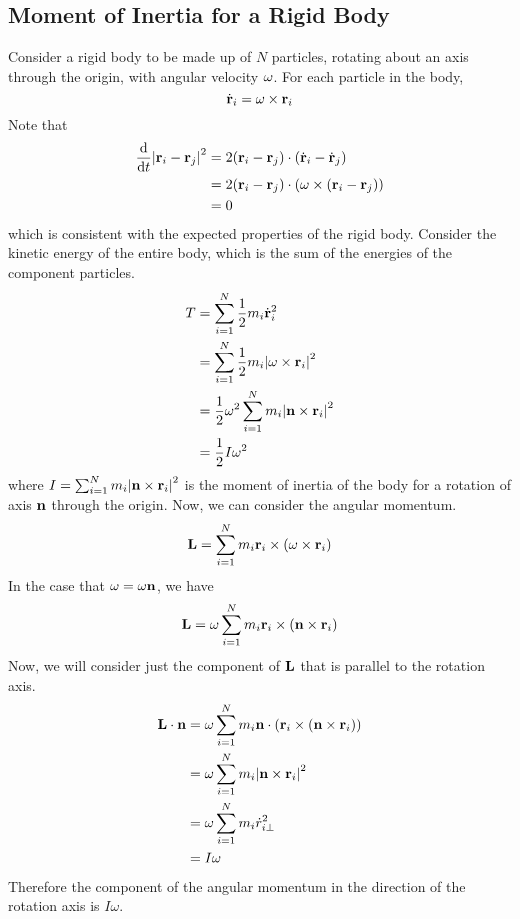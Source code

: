 \subsection{Moment of Inertia for a Rigid Body}
Consider a rigid body to be made up of \(N\) particles, rotating about an axis through the origin, with angular velocity \(\vb \omega\).
For each particle in the body,
\[
	\dot{\vb{r}}_i = \vb \omega \times \vb r_i
\]
Note that
\begin{align*}
	\dv{t} \abs{\vb r_i - \vb r_j}^2 & = 2(\vb r_i - \vb r_j) \cdot (\dot{\vb{r}}_i - \dot{\vb{r}}_j)                 \\
	                                 & = 2(\vb r_i - \vb r_j) \cdot (\omega \times (\vb r_i - \vb r_j)) \\
	                                 & = 0
\end{align*}
which is consistent with the expected properties of the rigid body.
Consider the kinetic energy of the entire body, which is the sum of the energies of the component particles.
\begin{align*}
	T & = \sum_{i=1}^N \frac{1}{2}m_i \dot{\vb r}_i^2                        \\
	  & = \sum_{i=1}^N \frac{1}{2}m_i \abs{\vb\omega \times \vb r_i}^2       \\
	  & = \frac{1}{2} \omega^2 \sum_{i=1}^N m_i \abs{\vb n \times \vb r_i}^2 \\
	  & = \frac{1}{2}I\omega^2
\end{align*}
where \(I = \sum_{i=1}^N m_i \abs{\vb n \times \vb r_i}^2\) is the moment of inertia of the body for a rotation of axis \(\vb n\) through the origin.
Now, we can consider the angular momentum.
\[
	\vb L = \sum_{i=1}^N m_i \vb r_i \times (\vb \omega \times \vb r_i)
\]
In the case that \(\vb\omega = \omega \vb n\), we have
\[
	\vb L = \omega \sum_{i=1}^N m_i \vb r_i \times (\vb n \times \vb r_i)
\]
Now, we will consider just the component of \(\vb L\) that is parallel to the rotation axis.
\begin{align*}
	\vb L \cdot \vb n & = \omega \sum_{i=1}^N m_i \vb n \cdot (\vb r_i \times (\vb n \times \vb r_i)) \\
	                  & = \omega\sum_{i=1}^N m_i \abs{ \vb n \times \vb r_i }^2                       \\
	                  & = \omega\sum_{i=1}^N m_i {\dot r}_{i\perp}^2                                  \\
	                  & = I\omega
\end{align*}
Therefore the component of the angular momentum in the direction of the rotation axis is \(I\omega\).
